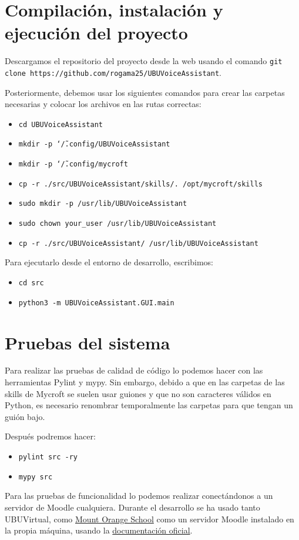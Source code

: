 \section{Compilación, instalación y ejecución del proyecto}
Descargamos el repositorio del proyecto desde la web usando el comando \texttt{git clone https://github.com/rogama25/UBUVoiceAssistant}.

Posteriormente, debemos usar los siguientes comandos para crear las carpetas necesarias y colocar los archivos en las rutas correctas:
\begin{itemize}
    \item \texttt{cd UBUVoiceAssistant}
    \item \texttt{mkdir -p \char`\~/.config/UBUVoiceAssistant}
    \item \texttt{mkdir -p \char`\~/.config/mycroft}
    \item \texttt{cp -r ./src/UBUVoiceAssistant/skills/. /opt/mycroft/skills}
    \item \texttt{sudo mkdir -p /usr/lib/UBUVoiceAssistant}
    \item \texttt{sudo chown your\_user /usr/lib/UBUVoiceAssistant}
    \item \texttt{cp -r ./src/UBUVoiceAssistant/ /usr/lib/UBUVoiceAssistant}
\end{itemize}

Para ejecutarlo desde el entorno de desarrollo, escribimos:
\begin{itemize}
    \item \texttt{cd src}
    \item \texttt{python3 -m UBUVoiceAssistant.GUI.main}
\end{itemize}

\section{Pruebas del sistema}
Para realizar las pruebas de calidad de código lo podemos hacer con las herramientas Pylint y mypy. Sin embargo, debido a que en las carpetas de las skills de Mycroft se suelen usar guiones y que no son caracteres válidos en Python, es necesario renombrar temporalmente las carpetas para que tengan un guión bajo.

Después podremos hacer:
\begin{itemize}
    \item \texttt{pylint src -ry}
    \item \texttt{mypy src}
\end{itemize}

Para las pruebas de funcionalidad lo podemos realizar conectándonos a un servidor de Moodle cualquiera. Durante el desarrollo se ha usado tanto UBUVirtual, como \href{https://school.moodledemo.net/}{Mount Orange School} como un servidor Moodle instalado en la propia máquina, usando la \href{https://docs.moodle.org/311/en/Step-by-step_Installation_Guide_for_Ubuntu}{documentación oficial}.